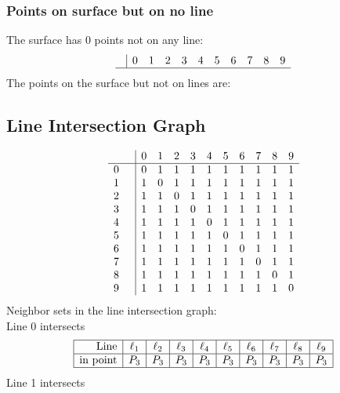 \documentclass{article}
\begin{document}
{\subsubsection*{Points on surface but on no line}
The surface has 0 points not on any line:\\
$$
\begin{array}{r|*{10}{r}}
 & 0 & 1 & 2 & 3 & 4 & 5 & 6 & 7 & 8 & 9\\
\hline
\end{array}
$$
The points on the surface but not on lines are:\\
\begin{multicols}{2}
\noindent
\end{multicols}
\subsection*{Line Intersection Graph}
{\arraycolsep=1pt
$$
\begin{array}{rr|*{10}r}
 &  & 0 & 1 & 2 & 3 & 4 & 5 & 6 & 7 & 8 & 9\\
\hline
0 &  & 0 & 1 & 1 & 1 & 1 & 1 & 1 & 1 & 1 & 1\\
1 &  & 1 & 0 & 1 & 1 & 1 & 1 & 1 & 1 & 1 & 1\\
2 &  & 1 & 1 & 0 & 1 & 1 & 1 & 1 & 1 & 1 & 1\\
3 &  & 1 & 1 & 1 & 0 & 1 & 1 & 1 & 1 & 1 & 1\\
4 &  & 1 & 1 & 1 & 1 & 0 & 1 & 1 & 1 & 1 & 1\\
5 &  & 1 & 1 & 1 & 1 & 1 & 0 & 1 & 1 & 1 & 1\\
6 &  & 1 & 1 & 1 & 1 & 1 & 1 & 0 & 1 & 1 & 1\\
7 &  & 1 & 1 & 1 & 1 & 1 & 1 & 1 & 0 & 1 & 1\\
8 &  & 1 & 1 & 1 & 1 & 1 & 1 & 1 & 1 & 0 & 1\\
9 &  & 1 & 1 & 1 & 1 & 1 & 1 & 1 & 1 & 1 & 0\\
\end{array}
$$
}%
Neighbor sets in the line intersection graph:\\
Line 0 intersects 
$$
\begin{array}{|r*{9}{|c}|}
\hline
\mbox{Line}  & \ell_{1} & \ell_{2} & \ell_{3} & \ell_{4} & \ell_{5} & \ell_{6} & \ell_{7} & \ell_{8} & \ell_{9}\\
\hline
\mbox{in point}  & P_{3} & P_{3} & P_{3} & P_{3} & P_{3} & P_{3} & P_{3} & P_{3} & P_{3}\\
\hline
\end{array}
$$
Line 1 intersects 
$$
\begin{array}{|r*{9}{|c}|}

\end{array}$$}
\end{document}
